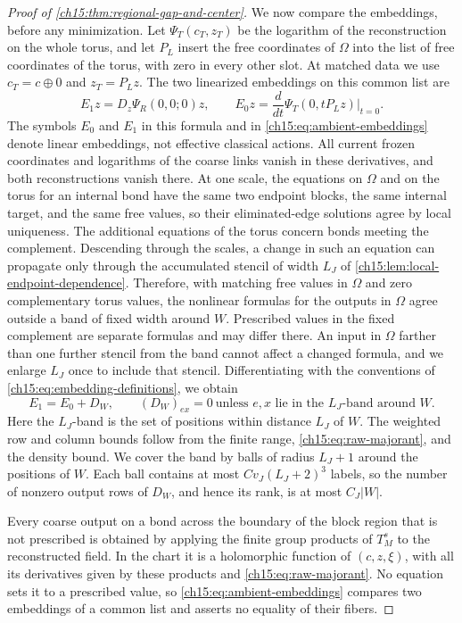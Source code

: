 \begin{proof}[Proof of \cref{ch15:thm:regional-gap-and-center}]
We now compare the embeddings, before any minimization. Let $\Psi_T(c_T,z_T)$ be the logarithm of the reconstruction on the whole torus, and let $P_L$ insert the free coordinates of $\Omega$ into the list of free coordinates of the torus, with zero in every other slot. At matched data we use $c_T=c\oplus0$ and $z_T=P_Lz$. The two linearized embeddings on this common list are
\begin{equation}\label{ch15:eq:embedding-definitions}
 E_1z=D_z\Psi_R(0,0;0)z,\qquad
 E_0z=\frac{d}{dt}\Psi_T(0,tP_Lz)\Big|_{t=0}.
\end{equation}
The symbols $E_0$ and $E_1$ in this formula and in \eqref{ch15:eq:ambient-embeddings} denote linear embeddings, not effective classical actions.
All current frozen coordinates and logarithms of the coarse links vanish in these derivatives, and both reconstructions vanish there. At one scale, the equations on $\Omega$ and on the torus for an internal bond have the same two endpoint blocks, the same internal target, and the same free values, so their eliminated-edge solutions agree by local uniqueness. The additional equations of the torus concern bonds meeting the complement. Descending through the scales, a change in such an equation can propagate only through the accumulated stencil of width $L_J$ of \cref{ch15:lem:local-endpoint-dependence}. Therefore, with matching free values in $\Omega$ and zero complementary torus values, the nonlinear formulas for the outputs in $\Omega$ agree outside a band of fixed width around $W$. Prescribed values in the fixed complement are separate formulas and may differ there. An input in $\Omega$ farther than one further stencil from the band cannot affect a changed formula, and we enlarge $L_J$ once to include that stencil. Differentiating with the conventions of \eqref{ch15:eq:embedding-definitions}, we obtain
\begin{equation}\label{ch15:eq:ambient-embeddings}
 E_1=E_0+D_W,\qquad
 (D_W)_{ex}=0\ \text{unless $e,x$ lie in the $L_J$-band around $W$}.
\end{equation}
Here the $L_J$-band is the set of positions within distance $L_J$ of $W$. The weighted row and column bounds follow from the finite range, \eqref{ch15:eq:raw-majorant}, and the density bound. We cover the band by balls of radius $L_J+1$ around the positions of $W$. Each ball contains at most $Cv_J(L_J+2)^3$ labels, so the number of nonzero output rows of $D_W$, and hence its rank, is at most $C_J|W|$.

Every coarse output on a bond across the boundary of the block region that is not prescribed is obtained by applying the finite group products of $T_M^s$ to the reconstructed field. In the chart it is a holomorphic function of $(c,z,\xi)$, with all its derivatives given by these products and \eqref{ch15:eq:raw-majorant}. No equation sets it to a prescribed value, so \eqref{ch15:eq:ambient-embeddings} compares two embeddings of a common list and asserts no equality of their fibers.


\end{proof}

